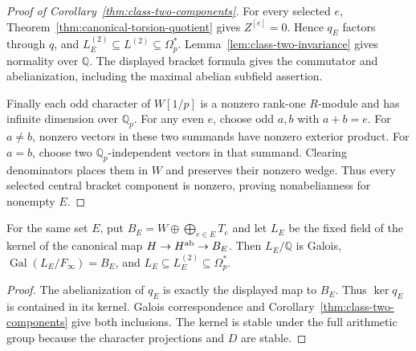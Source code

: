 \begin{proof}[Proof of Corollary~\ref{thm:class-two-components}]
For every selected $e$, Theorem~\ref{thm:canonical-torsion-quotient}
gives $Z^{[e]}=0$. Hence $q_E$ factors through $q$, and
$L_E^{(2)}\subseteq L^{(2)}\subseteq\Omega_p^*$.
Lemma~\ref{lem:class-two-invariance} gives normality over
$\mathbb Q$. The displayed bracket formula gives the
commutator and abelianization, including the maximal abelian
subfield assertion.

Finally each odd character of $W[1/p]$ is a nonzero rank-one
$R$-module and has infinite dimension over $\mathbb Q_p$.
For any even $e$, choose odd $a,b$ with $a+b=e$.
For $a\ne b$, nonzero vectors in these two summands have
nonzero exterior product.  For $a=b$, choose two
$\mathbb Q_p$-independent vectors in that summand.
Clearing denominators places them in $W$ and preserves their
nonzero wedge.  Thus every selected central bracket
component is nonzero, proving nonabelianness for nonempty $E$.
\end{proof}




\begin{corollary}\label{thm:abelian}
For the same set $E$, put $B_E=W\oplus\bigoplus_{e\in E}T_e$
and let $L_E$ be the fixed field of the kernel of the canonical
map $H\to H^{\rm ab}\to B_E$. Then $L_E/\mathbb Q$ is Galois,
$\operatorname{Gal}(L_E/F_\infty)=B_E$, and
$L_E\subseteq L_E^{(2)}\subseteq\Omega_p^*$.
\end{corollary}
\begin{proof}
The abelianization of $q_E$ is exactly the displayed map to $B_E$.
Thus $\ker q_E$ is contained in its kernel. Galois correspondence
and Corollary~\ref{thm:class-two-components} give both inclusions.
The kernel is stable under the full arithmetic group because the
character projections and $D$ are stable.
\end{proof}
